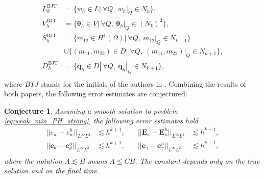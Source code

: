 \documentclass{ifacconf}
\newtheorem{conjecture}{Conjecture}
\begin{document}
\begin{equation}
\label{eq:BTJ}
	\begin{aligned}
	L_h^{\text{BJT}} &= \{w_h \in L | \ \forall Q, \ w_h|_{Q} \in N_k \}, \\
	V_h^{\text{BJT}} &= \{\bm{\theta}_h \in V | \ \forall Q,\ \bm{\theta}_h|_{Q} \in (N_k)^2 \}, \\
	S_h^{\text{BJT}} &= \{m_{12} \in H^1(\Omega)| \ \forall Q,\ m_{12}|_{Q} \in N_{k+1} \}  \\
	&\cup \{(m_{11}, m_{22}) \in D| \; \forall Q,\ (m_{11}, m_{22})|_{Q} \in N_{k+1} \}, \\
	D_h^{\text{BJT}} &= \{\bm{q}_h \in D | \ \forall Q,\ \bm{q}_h|_{Q} \in N_{k+1} \}, \\ 
	\end{aligned}
\end{equation}
where $BTJ$ stands for the initials of the authors in \cite{becacheWave,becacheElas}.
Combining the results of both papers, the following error estimates are conjectured:
\begin{conjecture}
Assuming a smooth solution to problem \eqref{eq:weak_min_PH_strong}, the following error estimates hold 
\begin{equation}
\label{eq:errBEC}
\begin{aligned}
||e_w - e_w^h||_{L^{\infty} L^2} &\lesssim h^{k+1}, \\
||\bm{e}_\theta - \bm{e}_\theta^h||_{L^{\infty} L^2} &\lesssim h^{k+1}, \\
\end{aligned} \quad
\begin{aligned}
||\bm{E}_\kappa - \bm{E}_\kappa^h||_{L^{\infty} L^2} &\lesssim  h^{k+1}, \\
||\bm{e}_\gamma - \bm{e}_\gamma^ h||_{L^{\infty} L^2} &\lesssim  h^{k+1}, \\
\end{aligned} 
\end{equation}
where the notation $A \lesssim B$ means $A \le C B$. The constant depends only on the true solution and on the final time.
\end{conjecture}
\end{document}
